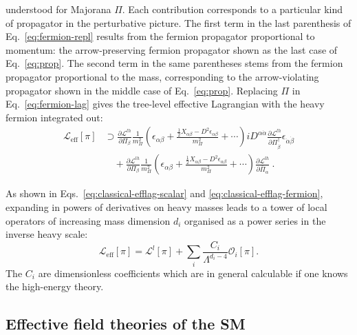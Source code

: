 understood for Majorana $\Pi$. Each contribution corresponds to a particular
kind of propagator in the perturbative picture. The first term in the last
parenthesis of Eq.~\eqref{eq:fermion-repl} results from the fermion propagator
proportional to momentum: the arrow-preserving fermion propagator shown as the
last case of Eq.~\eqref{eq:prop}. The second term in the same parentheses stems
from the fermion propagator proportional to the mass, corresponding to the
arrow-violating propagator shown in the middle case of Eq.~\eqref{eq:prop}.
Replacing $\Pi$ in Eq.~\eqref{eq:fermion-lag} gives the tree-level effective
Lagrangian with the heavy fermion integrated out:
\begin{equation}
  \begin{aligned}
  \label{eq:classical-efflag-fermion}
  \mathscr{L}_{\text{eff}}[\pi] &\supset \frac{\partial \mathscr{L}^{lh}}{\partial \Pi_{\beta}} \frac{1}{m_{\Pi}^{2}} \left(\epsilon_{\alpha \beta} + \frac{ \tfrac{1}{2} X_{\alpha \beta} - D^{2} \epsilon_{\alpha \beta}}{m_{\Pi}^{2}} +  \cdots \right) i D^{\alpha \dot{\alpha}} \frac{\partial \mathscr{L}^{lh}}{\partial \Pi^{\dagger}_{\dot{\beta}}} \epsilon_{\dot{\alpha} \dot{\beta}}\\
  &\quad + \frac{\partial \mathscr{L}^{lh}}{\partial \Pi_{\beta}} \frac{1}{m_{\Pi}^{2}} \left(\epsilon_{\alpha \beta} + \frac{ \tfrac{1}{2} X_{\alpha \beta} - D^{2} \epsilon_{\alpha \beta}}{m_{\Pi}^{2}} + \cdots \right) \frac{\partial \mathscr{L}^{lh}}{\partial \bar{\Pi}_{\alpha}} \ .
  \end{aligned}
\end{equation}

As shown in Eqs.~\eqref{eq:classical-efflag-scalar} and
\eqref{eq:classical-efflag-fermion}, expanding in powers of derivatives on heavy
masses leads to a tower of local operators of increasing mass dimension $d_{i}$
organised as a power series in the inverse heavy scale:
\begin{equation}
  \mathscr{L}_{\text{eff}}[\pi] = \mathscr{L}^{l}[\pi] + \sum_{i} \frac{C_{i}}{\Lambda^{d_{i}-4}} \mathcal{O}_{i}[\pi].
\end{equation}
The $C_{i}$ are dimensionless coefficients which are in general calculable if
one knows the high-energy theory.

\subsection{Effective field theories of the SM}
\label{sec:EFT-of-SM}

